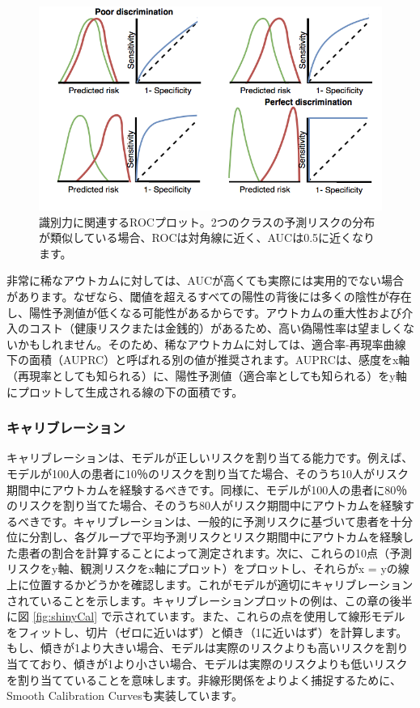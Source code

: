 \documentclass[
  11pt]{book}
\theoremstyle{definition}
\theoremstyle{definition}
\theoremstyle{definition}
\theoremstyle{definition}
\theoremstyle{remark}
\begin{document}
\begin{figure}
\includegraphics[width=1\linewidth]{images/PatientLevelPrediction/theory/roctheory} \caption{識別力に関連するROCプロット。2つのクラスの予測リスクの分布が類似している場合、ROCは対角線に近く、AUCは0.5に近くなります。}\label{fig:figuretheoryroctheory}
\end{figure}

非常に稀なアウトカムに対しては、AUCが高くても実際には実用的でない場合があります。なぜなら、閾値を超えるすべての陽性の背後には多くの陰性が存在し、陽性予測値が低くなる可能性があるからです。アウトカムの重大性および介入のコスト（健康リスクまたは金銭的）があるため、高い偽陽性率は望ましくないかもしれません。そのため、稀なアウトカムに対しては、適合率-再現率曲線下の面積（AUPRC）と呼ばれる別の値が推奨されます。AUPRCは、感度をx軸（再現率としても知られる）に、陽性予測値（適合率としても知られる）をy軸にプロットして生成される線の下の面積です。 

\subsubsection*{キャリブレーション}\label{ux30adux30e3ux30eaux30d6ux30ecux30fcux30b7ux30e7ux30f3}

キャリブレーションは、モデルが正しいリスクを割り当てる能力です。例えば、モデルが100人の患者に10％のリスクを割り当てた場合、そのうち10人がリスク期間中にアウトカムを経験するべきです。同様に、モデルが100人の患者に80％のリスクを割り当てた場合、そのうち80人がリスク期間中にアウトカムを経験するべきです。キャリブレーションは、一般的に予測リスクに基づいて患者を十分位に分割し、各グループで平均予測リスクとリスク期間中にアウトカムを経験した患者の割合を計算することによって測定されます。次に、これらの10点（予測リスクをy軸、観測リスクをx軸にプロット）をプロットし、それらがx = yの線上に位置するかどうかを確認します。これがモデルが適切にキャリブレーションされていることを示します。キャリブレーションプロットの例は、この章の後半に図 \ref{fig:shinyCal} で示されています。また、これらの点を使用して線形モデルをフィットし、切片（ゼロに近いはず）と傾き（1に近いはず）を計算します。もし、傾きが1より大きい場合、モデルは実際のリスクよりも高いリスクを割り当てており、傾きが1より小さい場合、モデルは実際のリスクよりも低いリスクを割り当てていることを意味します。非線形関係をよりよく捕捉するために、Smooth Calibration Curvesも実装しています。 
\end{document}
